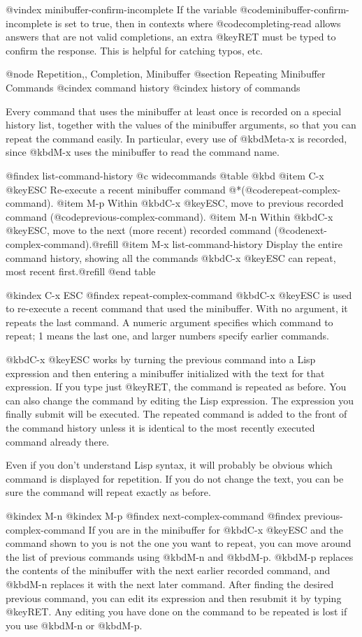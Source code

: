 {{@vindex minibuffer-confirm-incomplete
If the variable @code{minibuffer-confirm-incomplete} is set to true,
then in contexts where @code{completing-read} allows answers that are
not valid completions, an extra @key{RET} must be typed to confirm the
response.  This is helpful for catching typos, etc.

@node Repetition,, Completion, Minibuffer
@section Repeating Minibuffer Commands
@cindex command history
@cindex history of commands

  Every command that uses the minibuffer at least once is recorded on a
special history list, together with the values of the minibuffer arguments,
so that you can repeat the command easily.  In particular, every
use of @kbd{Meta-x} is recorded, since @kbd{M-x} uses the minibuffer to
read the command name.

@findex list-command-history
@c widecommands
@table @kbd
@item C-x @key{ESC}
Re-execute a recent minibuffer command @*(@code{repeat-complex-command}).
@item M-p
Within @kbd{C-x @key{ESC}}, move to previous recorded command
(@code{previous-complex-command}).
@item M-n
Within @kbd{C-x @key{ESC}}, move to the next (more recent) recorded
command (@code{next-complex-command}).@refill
@item M-x list-command-history
Display the entire command history, showing all the commands
@kbd{C-x @key{ESC}} can repeat, most recent first.@refill
@end table

@kindex C-x ESC
@findex repeat-complex-command
  @kbd{C-x @key{ESC}} is used to re-execute a recent command that used
the minibuffer. With no argument, it repeats the last command.  A numeric
argument specifies which command to repeat; 1 means the last one, and
larger numbers specify earlier commands.

  @kbd{C-x @key{ESC}} works by turning the previous command into a Lisp
expression and then entering a minibuffer initialized with the text for
that expression.  If you type just @key{RET}, the command is repeated as
before.  You can also change the command by editing the Lisp expression.
The expression you finally submit will be executed.  The repeated
command is added to the front of the command history unless it is
identical to the most recently executed command already there.

  Even if you don't understand Lisp syntax, it will probably be obvious
which command is displayed for repetition.  If you do not change the text,
you can be sure the command will repeat exactly as before.

@kindex M-n
@kindex M-p
@findex next-complex-command
@findex previous-complex-command
  If you are in the minibuffer for @kbd{C-x @key{ESC}} and the command shown
to you is not the one you want to repeat, you can move around the list of
previous commands using @kbd{M-n} and @kbd{M-p}.  @kbd{M-p} replaces the
contents of the minibuffer with the next earlier recorded command, and
@kbd{M-n} replaces it with the next later command.  After finding the
desired previous command, you can edit its expression and then
resubmit it by typing @key{RET}.  Any editing you have done on the
command to be repeated is lost if you use @kbd{M-n} or @kbd{M-p}.

}}
